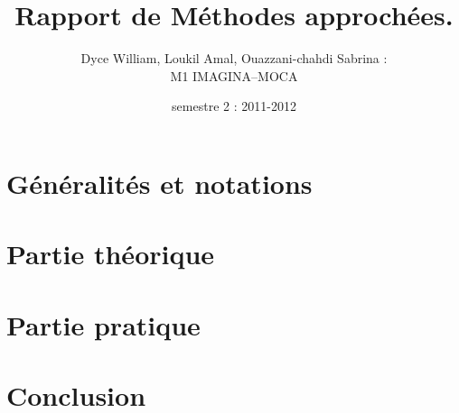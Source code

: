 \documentclass[a4paper, 12pt]{article}
\title{Rapport de Méthodes approchées.}
\author{Dyce William, Loukil Amal, Ouazzani-chahdi Sabrina : \\ M1 IMAGINA--MOCA}
\date{semestre 2 : 2011-2012}
\begin{document}
 

\maketitle



\pagebreak

\tableofcontents

\pagebreak

\listoffigures
\listoftables

\pagebreak

\section{Généralités et notations}


\pagebreak

\section{Partie théorique}


\section{Partie pratique}


\section{Conclusion}

\end{document}
